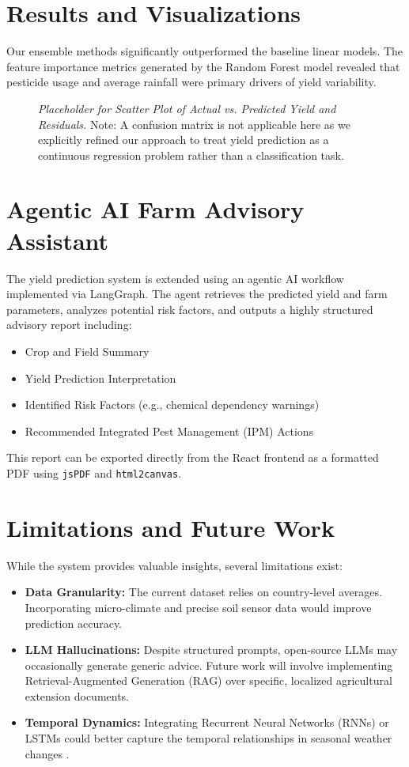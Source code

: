 \documentclass[12pt,a4paper]{article}
\begin{document}
\section{Results and Visualizations}
Our ensemble methods significantly outperformed the baseline linear models. The feature importance metrics generated by the Random Forest model revealed that pesticide usage and average rainfall were primary drivers of yield variability.

\begin{figure}[H]
    \centering
    \caption{\textit{Placeholder for Scatter Plot of Actual vs. Predicted Yield and Residuals.} Note: A confusion matrix is not applicable here as we explicitly refined our approach to treat yield prediction as a continuous regression problem rather than a classification task.}
    \label{fig:residuals}
\end{figure}

\section{Agentic AI Farm Advisory Assistant}
The yield prediction system is extended using an agentic AI workflow implemented via LangGraph. The agent retrieves the predicted yield and farm parameters, analyzes potential risk factors, and outputs a highly structured advisory report including:
\begin{itemize}
    \item Crop and Field Summary
    \item Yield Prediction Interpretation
    \item Identified Risk Factors (e.g., chemical dependency warnings)
    \item Recommended Integrated Pest Management (IPM) Actions
\end{itemize}
This report can be exported directly from the React frontend as a formatted PDF using \texttt{jsPDF} and \texttt{html2canvas}.

\section{Limitations and Future Work}
While the system provides valuable insights, several limitations exist:
\begin{itemize}
    \item \textbf{Data Granularity:} The current dataset relies on country-level averages. Incorporating micro-climate and precise soil sensor data would improve prediction accuracy.
    \item \textbf{LLM Hallucinations:} Despite structured prompts, open-source LLMs may occasionally generate generic advice. Future work will involve implementing Retrieval-Augmented Generation (RAG) over specific, localized agricultural extension documents.
    \item \textbf{Temporal Dynamics:} Integrating Recurrent Neural Networks (RNNs) or LSTMs could better capture the temporal relationships in seasonal weather changes \cite{deep_learning_agri}.
\end{itemize}
\end{document}

